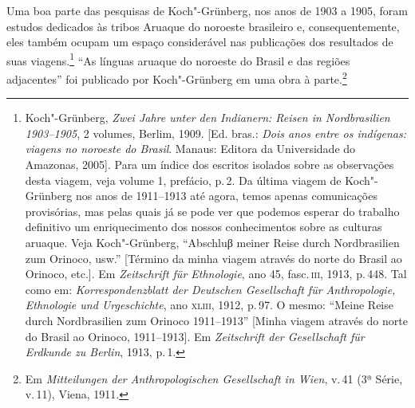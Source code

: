 Uma boa parte das pesquisas de Koch"-Grünberg, nos anos de 1903 a 1905,
foram estudos dedicados às tribos Aruaque do noroeste brasileiro e,
consequentemente, eles também ocupam um espaço considerável nas
publicações dos resultados de suas viagens.\footnote{Koch"-Grünberg,
\textit{Zwei Jahre unter den Indianern: Reisen in Nordbrasilien
  1903--1905}, 2 volumes, Berlim, 1909. {[}Ed. bras.: \textit{Dois anos entre os indígenas: viagens no noroeste do Brasil}. Manaus:
  Editora da Universidade do Amazonas, 2005{]}. Para um índice dos
  escritos isolados sobre as observações desta viagem, veja volume 1,
  prefácio, p.\,2. Da última viagem de Koch"-Grünberg nos anos de
  1911--1913 até agora, temos apenas comunicações provisórias, mas pelas
  quais já se pode ver que podemos esperar do trabalho definitivo um
  enriquecimento dos nossos conhecimentos sobre as culturas aruaque. Veja
  Koch"-Grünberg, ``Abschluβ meiner Reise durch Nordbrasilien zum
  Orinoco, usw.'' {[}Término da minha viagem através do norte do Brasil
  ao Orinoco, etc.{]}. Em \textit{Zeitschrift für Ethnologie}, ano 45,
  fasc.\,\textsc{iii}, 1913, p.\,448. Tal como em: \textit{Korrespondenzblatt
  der Deutschen Gesellschaft für Anthropologie, Ethnologie und
  Urgeschichte}, ano \textsc{xliii}, 1912, p.\,97. O mesmo: ``Meine Reise durch
  Nordbrasilien zum Orinoco 1911--1913'' {[}Minha viagem através do norte
  do Brasil ao Orinoco, 1911--1913{]}. Em \textit{Zeitschrift der
  Gesellschaft für Erdkunde zu Berlin}, 1913, p.\,1.} ``As
línguas aruaque do noroeste do Brasil e das regiões adjacentes'' foi
publicado por Koch"-Grünberg em uma obra à parte.\footnote{Em
  \textit{Mitteilungen der Anthropologischen Gesellschaft in Wien}, v.\,41
  (3ª Série, v.\,11), Viena, 1911.} %


